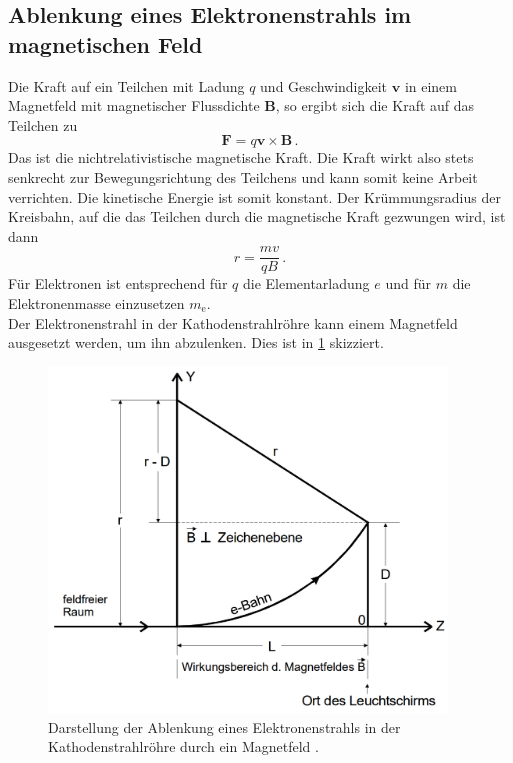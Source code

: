 \subsection{Ablenkung eines Elektronenstrahls im magnetischen Feld}
\label{subsec:immagnetfeld}
Die Kraft auf ein Teilchen mit Ladung $q$ und Geschwindigkeit $\symbf{v}$ in einem
Magnetfeld mit magnetischer Flussdichte $\symbf{B}$, so ergibt sich die Kraft
auf das Teilchen zu
\begin{equation}
  \symbf{F} = q \symbf{v} \times \symbf{B}\,.
  \label{eqn:magkraft}
\end{equation}
Das ist die nichtrelativistische magnetische Kraft. Die Kraft wirkt also stets senkrecht
zur Bewegungsrichtung des Teilchens und kann somit keine Arbeit verrichten.
Die kinetische Energie ist somit konstant.
Der Krümmungsradius der Kreisbahn, auf die das Teilchen durch die magnetische Kraft gezwungen
wird, ist dann
\begin{equation}
  r = \frac{m v}{q B}\,.
  \label{eqn:kruemmung}
\end{equation}
Für Elektronen ist entsprechend für $q$ die Elementarladung $e$ und für $m$ die Elektronenmasse
einzusetzen $m_\text{e}$. \\
Der Elektronenstrahl in der Kathodenstrahlröhre kann einem Magnetfeld ausgesetzt werden,
um ihn abzulenken. Dies ist in \ref{fig:magnetkathode} skizziert.

\begin{figure}[H]
  \centering
  \includegraphics[width=300pt]{data/immagnetfeld.png}
  \caption{Darstellung der Ablenkung eines Elektronenstrahls in der Kathodenstrahlröhre durch ein Magnetfeld \cite{Versuchsanleitung502}.}
  \label{fig:magnetkathode}
\end{figure}

